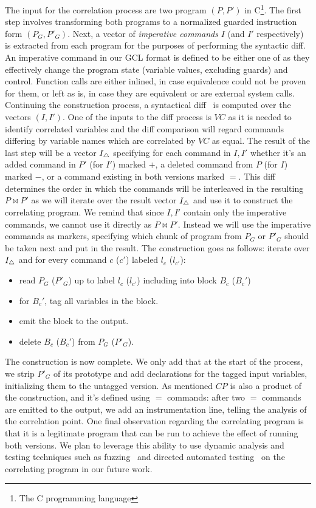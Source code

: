 The input for the correlation process are two program $(P,P')$ in C\footnote{The C programming language}. The first step involves transforming both programs to a normalized guarded instruction form $(P_{G},P'_{G})$. Next, a vector of \emph{imperative commands} $I$ (and $I'$ respectively) is extracted from each program for the purposes of performing the syntactic diff. An imperative command in our GCL format is defined to be either one of  as they effectively change the program state (variable values, excluding guards) and control. Function calls are either inlined, in case equivalence could not be proven for them, or left as is, in case they are equivalent or are external system calls. Continuing the construction process, a syntactical diff~\cite{HuntMcIlroy75} is computed over the vectors $(I,I')$. One of the inputs to the diff process is $VC$ as it is needed to identify correlated variables and the diff comparison will regard commands differing by variable names which are correlated by $VC$ as equal. The result of the last step will be a vector $I_{\triangle}$ specifying for each command in $I,I'$ whether it's an added command in $P'$ (for $I'$) marked $+$, a deleted command from $P$ (for $I$) marked $-$, or a command existing in both versions marked $=$. This diff determines the order in which the commands will be interleaved in the resulting $P \bowtie P'$ as we will iterate over the result vector $I_{\triangle}$ and use it to construct the correlating program. We remind that since $I,I'$ contain only the imperative commands, we cannot use it directly as $P \bowtie P'$. Instead we will use the imperative commands as markers, specifying which chunk of program from $P_G$ or $P'_G$ should be taken next and put in the result. The construction goes as follows: iterate over $I_{\triangle}$ and for every command $c$ ($c'$) labeled $l_c$ ($l_{c'}$):
\begin{itemize}
\item read $P_G$ ($P'_G$) up to label $l_c$ ($l_{c'}$) including into block $B_c$ ($B_c'$)
\item for $B_c'$, tag all variables in the block.
\item emit the block to the output.
\item delete $B_c$ ($B_c'$) from $P_G$ ($P'_G$).
\end{itemize}
The construction is now complete. We only add that at the start of the process, we strip $P'_G$ of its prototype and add declarations for the tagged input variables, initializing them to the untagged version.
As mentioned $CP$ is also a product of the construction, and it's defined using $=$ commands: after two $=$ commands are emitted to the output, we add an instrumentation line, telling the analysis of the correlation point.
One final observation regarding the correlating program is that it is a legitimate program that can be run to achieve the effect of running both versions. We plan to leverage this ability to use dynamic analysis and testing techniques such as fuzzing~\cite{NethercoteSeward07} and directed automated testing~\cite{CadarDunbarEngler08} on the correlating program in our future work.
